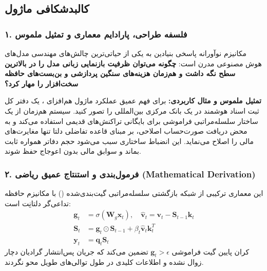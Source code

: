 \subsection{کالبدشکافی ماژول }

\subsubsection*{۱. فلسفه طراحی، پارادایم معماری و تمثیل ملموس}
مکانیزم نوآورانه  پاسخی بنیادین به یکی از حیاتی‌ترین چالش‌های مهندسی مدل‌های هوش مصنوعی مدرن است: \textbf{چگونه می‌توان ظرفیت بازنمایی زبانی مدل را در بالاترین سطح نگه داشت و هم‌زمان هزینه‌های سنگین پردازشی و بن‌بست‌های حافظه سخت‌افزار را مهار کرد؟}

\textbf{تمثیل ملموس و مثال کاربردی:}
برای فهم عمیق عملکرد ماژول هم‌افزای ، یک دفتر کل ثبت اسناد هوشمند در یک بانک مرکزی بین‌المللی را تصور کنید. سیستم هم‌زمان از یک ساختار سلسله‌مراتبی فراموشی برای بایگانی تراکنش‌های قدیمی استفاده می‌کند و به محض دریافت صورت‌حساب اصلاحی، بر مبنای قاعده تفاضلی دلتا تنها مغایرت‌های مالی را اصلاح می‌نماید. این انضباط ساختاری سبب می‌شود حجم دفاتر همواره ثابت بماند و سوابق مالی بدون اعوجاج حفظ شوند.

\subsubsection*{۲. فرمول‌بندی و استنتاج عمیق ریاضی (Mathematical Derivation)}
این معماری ترکیبی از شبکه بازگشتی سلسله‌مراتبی گیت‌بندی‌شده () با مکانیزم حافظه تداعی‌گر دلتانِت است:
\begin{align}
\mathbf{g}_t &= \sigma(\mathbf{W}_g \mathbf{x}_t), \quad \hat{\mathbf{v}}_t = \mathbf{v}_t - \mathbf{S}_{t-1}\mathbf{k}_t \\
\mathbf{S}_t &= \mathbf{g}_t \odot \mathbf{S}_{t-1} + \beta_t \hat{\mathbf{v}}_t \mathbf{k}_t^T \\
\mathbf{y}_t &= \mathbf{q}_t \mathbf{S}_t
\end{align}
کران پایین گیت فراموشی $\mathbf{g}_t > \epsilon$ تضمین می‌کند که جریان پس‌انتشار گرادیان دچار زوال نشده و اطلاعات کلیدی در طول توالی‌های طویل محو نگردند.

